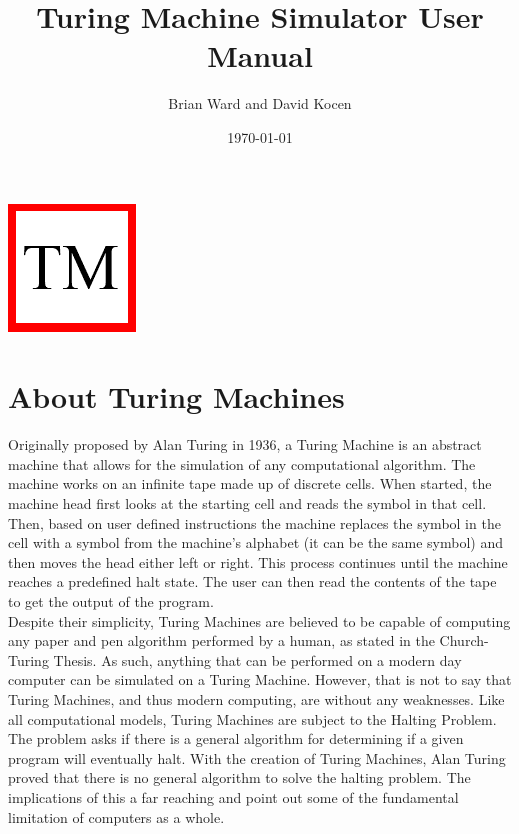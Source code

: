 \documentclass[12pt,letterpaper]{article}
\title{Turing Machine Simulator User Manual}
\author{Brian Ward and David Kocen}
\date{\today}
\begin{document}
\maketitle
\begin{center}
	\includegraphics{images/icon.png}
\end{center}
\pagebreak
\tableofcontents

\pagebreak

\section{About Turing Machines}

\noindent Originally proposed by Alan Turing in 1936, a Turing Machine is an abstract machine that allows for the simulation of any computational algorithm. The machine works on an infinite tape made up of discrete cells. When started, the machine head first looks at the starting cell and reads the symbol in that cell. Then, based on user defined instructions the machine replaces the symbol in the cell with a symbol from the machine's alphabet (it can be the same symbol) and then moves the head either left or right. This process continues until the machine reaches a predefined halt state. The user can then read the contents of the tape to get the output of the program.\\

\noindent Despite their simplicity, Turing Machines are believed to be capable of computing any paper and pen algorithm performed by a human, as stated in the Church-Turing Thesis. As such, anything that can be performed on a modern day computer can be simulated on a Turing Machine. However, that is not to say that Turing Machines, and thus modern computing, are without any weaknesses. Like all computational models, Turing Machines are subject to the Halting Problem. The problem asks if there is a general algorithm for determining if a given program will eventually halt. With the creation of Turing Machines, Alan Turing proved that there is no general algorithm to solve the halting problem. The implications of this a far reaching and point out some of the fundamental limitation of computers as a whole.\\ 
\end{document}
